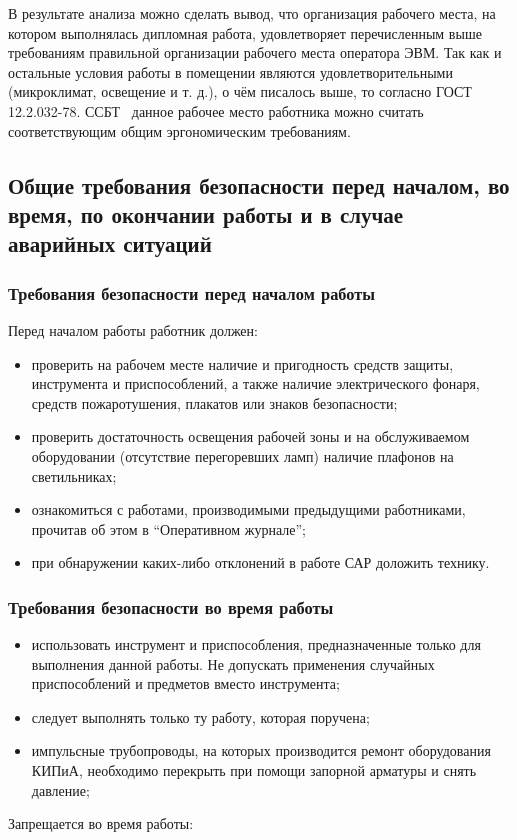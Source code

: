 В результате анализа можно сделать вывод, что организация рабочего места, на котором выполнялась дипломная работа, удовлетворяет перечисленным выше требованиям правильной организации рабочего места оператора ЭВМ. Так как и остальные условия работы в помещении являются удовлетворительными (микроклимат, освещение и т. д.), о чём писалось выше, то согласно ГОСТ 12.2.032-78. ССБТ~\cite{gost_sec_ergonom_32} данное рабочее место работника можно считать соответствующим общим эргономическим требованиям.

\subsection{Общие требования безопасности перед началом, во время, по окончании работы и в случае аварийных ситуаций}
\subsubsection{Требования безопасности перед началом работы}

Перед началом работы работник должен:

\begin{itemize}
\item проверить на рабочем месте наличие и пригодность средств защиты, инструмента и приспособлений, а также наличие электрического фонаря, средств пожаротушения, плакатов или знаков безопасности;
\item проверить достаточность освещения рабочей зоны и на обслуживаемом оборудовании (отсутствие перегоревших ламп) наличие плафонов на светильниках;
\item ознакомиться с работами, производимыми предыдущими работниками, прочитав об этом в ``Оперативном журнале'';
\item при обнаружении каких-либо отклонений в работе САР доложить технику.
\end{itemize}
\subsubsection{Требования безопасности во время работы}
\begin{itemize}
\item использовать инструмент и приспособления, предназначенные только для выполнения данной работы. Не допускать применения случайных приспособлений и предметов вместо инструмента;
\item следует выполнять только ту работу, которая поручена;
\item импульсные трубопроводы, на которых производится ремонт оборудования КИПиА, необходимо перекрыть при помощи запорной арматуры и снять давление;
\end{itemize}
Запрещается во время работы:

